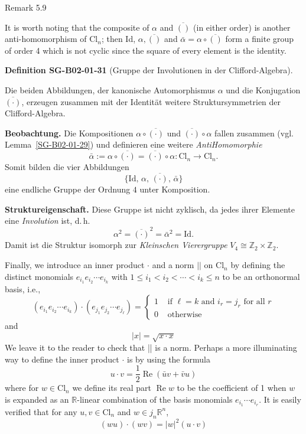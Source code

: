 \documentclass[10pt, letterpaper]{article}
\newcommand{\Z}{\mathbb{Z}}
\newcommand{\Cl}{\mathrm{Cl}}
\newcommand{\CustomHeading}[3]{%
  \par\medskip\noindent%
  \textbf{#1 #2} \textnormal{(#3)}.\enskip%
}
\newenvironment{DEF}[2]{\begin{unitbox}\CustomHeading{Definition}{#1}{#2}}{\end{unitbox}}
\begin{document}
Remark 5.9


It is worth noting that the composite of $\alpha$ and $\overline{()}$ (in either order) is another anti-homomorphism of $\mathrm{Cl}_{n}$; then Id, $\alpha, \overline{()}$ and $\bar{\alpha}=\alpha \circ \overline{()}$ form a finite group of order 4 which is not cyclic since the square of every element is the identity.


\begin{DEF}{SG-B02-01-31}{Gruppe der Involutionen in der Clifford-Algebra}
Die beiden Abbildungen, der kanonische Automorphismus \(\alpha\) und die Konjugation \(\overline{(\cdot)}\),
erzeugen zusammen mit der Identität weitere Struktursymmetrien der Clifford-Algebra.

\textbf{Beobachtung.}  
Die Kompositionen \(\alpha\circ\overline{(\cdot)}\) und \(\overline{(\cdot)}\circ\alpha\)
fallen zusammen (vgl. Lemma~\ref{SG-B02-01-29}) und definieren eine weitere
\emph{Anti\-Homomorphie}
\[
\bar{\alpha} := \alpha \circ \overline{(\cdot)} = \overline{(\cdot)} \circ \alpha : \Cl_n \to \Cl_n.
\]
Somit bilden die vier Abbildungen
\[
\{\mathrm{Id},\, \alpha,\, \overline{(\cdot)},\, \bar{\alpha}\}
\]
eine endliche Gruppe der Ordnung \(4\) unter Komposition.

\textbf{Struktureigenschaft.}  
Diese Gruppe ist nicht zyklisch, da jedes ihrer Elemente eine \emph{Involution} ist, d.\,h.
\[
\alpha^2 = \overline{(\cdot)}^2 = \bar{\alpha}^2 = \mathrm{Id}.
\]
Damit ist die Struktur isomorph zur \emph{Kleinschen Vierergruppe} \(V_4 \cong \Z_2 \times \Z_2\).
\end{DEF}


Finally, we introduce an inner product $\cdot$ and a norm $\left|\mid\right.$ on $\mathrm{Cl}_{n}$ by defining the distinct monomials $e_{i_{1}} e_{i_{2}} \cdots e_{i_{k}}$ with $1 \leqslant i_{1}<i_{2}<\cdots<i_{k} \leqslant n$ to be an orthonormal basis, i.e.,
$$
\left(e_{i_{1}} e_{i_{2}} \cdots e_{i_{k}}\right) \cdot\left(e_{j_{1}} e_{j_{2}} \cdots e_{j_{\ell}}\right)= \begin{cases}1 & \text { if } \ell=k \text { and } i_{r}=j_{r} \text { for all } r \\ 0 & \text { otherwise }\end{cases}
$$
and
$$
|x|=\sqrt{x \cdot x}
$$
We leave it to the reader to check that || is a norm. Perhaps a more illuminating way to define the inner product $\cdot$ is by using the formula
$$
u \cdot v=\frac{1}{2} \operatorname{Re}(\bar{u} v+\bar{v} u)
$$
where for $w \in \mathrm{Cl}_{n}$ we define its real part $\operatorname{Re} w$ to be the coefficient of 1 when $w$ is expanded as an $\mathbb{R}$-linear combination of the basis monomials $e_{i_{1}} \cdots e_{i_{r}}$. It is easily verified that for any $u, v \in \mathrm{Cl}_{n}$ and $w \in j_{n} \mathbb{R}^{n}$,
$$
(w u) \cdot(w v)=|w|^{2}(u \cdot v)
$$
\end{document}
